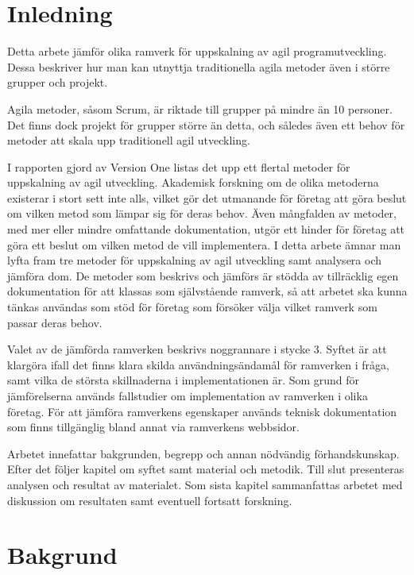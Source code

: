 \section{Inledning}
	
	Detta arbete jämför olika ramverk för uppskalning av agil programutveckling. Dessa beskriver hur man kan utnyttja traditionella agila metoder även i större grupper och projekt. 
	
	Agila metoder, såsom Scrum, är riktade till grupper på mindre än 10 personer\cite{scrum_guide}. Det finns dock projekt för grupper större än detta, och således även ett behov för metoder att skala upp traditionell agil utveckling.
	
	I rapporten gjord av Version One \cite{version_one_report} listas det upp ett flertal metoder för uppskalning av agil utveckling. Akademisk forskning om de olika metoderna existerar i stort sett inte alls, vilket gör det utmanande för företag att göra beslut om vilken metod som lämpar sig för deras behov. Även mångfalden av metoder, med mer eller mindre omfattande dokumentation, utgör ett hinder för företag att göra ett beslut om vilken metod de vill implementera. 	
	I detta arbete ämnar man lyfta fram tre metoder för uppskalning av agil utveckling samt analysera och jämföra dom.
	De metoder som beskrivs och jämförs är stödda av tillräcklig egen dokumentation för att klassas som självstående ramverk, så att arbetet ska kunna tänkas användas som stöd för företag som försöker välja vilket ramverk som passar deras behov.
	
	Valet av de jämförda ramverken beskrivs noggrannare i stycke 3.
	Syftet är att klargöra ifall det finns klara skilda användningsändamål för ramverken i fråga, samt vilka de största skillnaderna i implementationen är. Som grund för jämförelserna används fallstudier om implementation av ramverken i olika företag. För att jämföra ramverkens egenskaper används teknisk dokumentation som finns tillgänglig bland annat via ramverkens webbsidor.
	
	Arbetet innefattar bakgrunden, begrepp och annan nödvändig förhandskunskap. Efter det följer kapitel om syftet samt material och metodik. Till slut presenteras analysen och resultat av materialet. Som sista kapitel sammanfattas arbetet med diskussion om resultaten samt eventuell fortsatt forskning.
	
	
\newpage
\section{Bakgrund}
	
